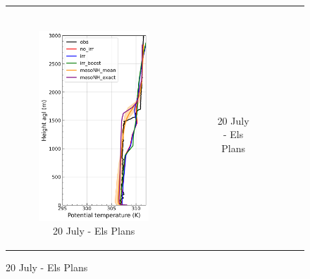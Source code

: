 \begin{figure}[hbtp]
{\begin{tabular}{@{}cccc@{}}
\begin{subfigure}[t]{0.283\textwidth}
        \end{subfigure} \\
        \begin{subfigure}[t]{0.382\textwidth}
            \caption{20 July - Els Plans}
            \includegraphics[width=\textwidth]{images/chap6/profiles/profile_elsplans_theta_2007_.png}
        \end{subfigure} &
        \begin{subfigure}[t]{0.289\textwidth}
            \caption{20 July - Els Plans}

\end{subfigure}
\end{tabular}}
\end{figure}
